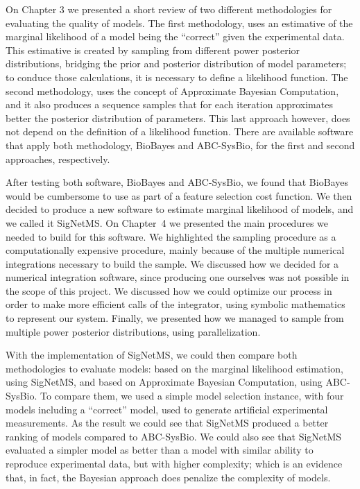 On Chapter 3 we presented a short review of two different methodologies
for evaluating the quality of models. The first methodology, uses an
estimative of the marginal likelihood of a model being the ``correct''
given the experimental data. This estimative is created by sampling from
different power posterior distributions, bridging the prior and
posterior distribution of model parameters; to conduce those
calculations, it is necessary to define a likelihood function. The 
second methodology, uses the concept of Approximate Bayesian 
Computation, and it also produces a sequence samples that for each
iteration approximates better the posterior distribution of parameters.
This last approach however, does not depend on the definition of a
likelihood function. There are available software that apply both
methodology, BioBayes and ABC-SysBio, for the first and second
approaches, respectively.

After testing both software, BioBayes and ABC-SysBio, we found that
BioBayes would be cumbersome to use as part of a feature selection cost
function. We then decided to produce a new software to estimate marginal
likelihood of models, and we called it SigNetMS. On Chapter~4 we
presented the main procedures we needed to build for this software. We
highlighted the sampling procedure as a computationally expensive
procedure, mainly because of the multiple numerical integrations
necessary to build the sample. We discussed how we decided for a
numerical integration software, since producing one ourselves was not
possible in the scope of this project. We discussed how we could
optimize our process in order to make more efficient calls of the
integrator, using symbolic mathematics to represent our system. Finally,
we presented how we managed to sample from multiple power posterior
distributions, using parallelization.

With the implementation of SigNetMS, we could then compare both
methodologies to evaluate models: based on the marginal likelihood
estimation, using SigNetMS, and based on Approximate Bayesian
Computation, using ABC-SysBio. To compare them, we used a simple model
selection instance, with four models including a ``correct'' model, used
to generate artificial experimental measurements. As the result we
could see that SigNetMS produced a better ranking of models compared to
ABC-SysBio. We could also see that SigNetMS evaluated a simpler model as
better than a model with similar ability to reproduce experimental data,
but with higher complexity; which is an evidence that, in fact, the
Bayesian approach does penalize the complexity of models.

